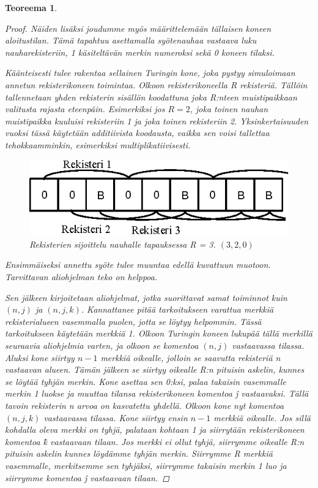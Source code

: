 \documentclass[a4paper, 12pt]{article}
\newtheorem{teor}{Teoreema}
\begin{document}
\begin{teor}
\begin{proof}
Näiden lisäksi joudumme myös määrittelemään tällaisen koneen aloitustilan. Tämä tapahtuu asettamalla syötenauhaa vastaava luku nauharekisteriin, 1 käsiteltävän merkin numeroksi sekä 0 koneen tilaksi.

Käänteisesti tulee rakentaa sellainen Turingin kone, joka pystyy simuloimaan annetun rekisterikoneen toimintaa. Olkoon rekisterikoneella R rekisteriä. Tällöin tallennetaan yhden rekisterin sisällön koodattuna joka R:nteen muistipaikkaan valitusta rajasta eteenpäin. Esimerkiksi jos $R = 2$, joka toinen nauhan muistipaikka kuuluisi rekisteriin 1 ja joka toinen rekisteriin 2. Yksinkertaisuuden vuoksi tässä käytetään additiivista koodausta, vaikka sen voisi tallettaa tehokkaamminkin, esimerkiksi multiplikatiivisesti. 

\begin{figure}[H]
\begin{center}
\includegraphics{graph4b.eps}
\caption{Rekisterien sijoittelu nauhalle tapauksessa R = 3. $(3, 2, 0)$}
\end{center}
\end{figure}

Ensimmäiseksi annettu syöte tulee muuntaa edellä kuvattuun muotoon. Tarvittavan aliohjelman teko on helppoa.

Sen jälkeen kirjoitetaan aliohjelmat, jotka suorittavat samat toiminnot kuin $(n, j)$ ja $(n, j, k)$. Kannattanee pitää tarkoitukseen varattua merkkiä rekisterialueen vasemmalla puolen, jotta se löytyy helpommin. Tässä tarkoitukseen käytetään merkkiä 1. Olkoon Turingin koneen lukupää tällä merkillä seuraavia aliohjelmia varten, ja olkoon se komentoa $(n, j)$ vastaavassa tilassa. Aluksi kone siirtyy $n-1$ merkkiä oikealle, jolloin se saavutta rekisteriä n vastaavan alueen. Tämän jälkeen se siirtyy oikealle R:n pituisin askelin, kunnes se löytää tyhjän merkin. Kone asettaa sen 0:ksi, palaa takaisin vasemmalle merkin 1 luokse ja muuttaa tilansa rekisterikoneen komentoa \^j vastaavaksi. Tällä tavoin rekisterin n arvoa on kasvatettu yhdellä. Olkoon kone nyt komentoa $(n, j, k)$ vastaavassa tilassa. Kone siirtyy ensin $n - 1$ merkkiä oikealle. Jos sillä kohdalla oleva merkki on tyhjä, palataan kohtaan 1 ja siirrytään rekisterikoneen komentoa \^k vastaavaan tilaan. Jos merkki ei ollut tyhjä, siirrymme oikealle R:n pituisin askelin kunnes löydämme tyhjän merkin. Siirrymme R merkkiä vasemmalle, merkitsemme sen tyhjäksi, siirrymme takaisin merkin 1 luo ja siirrymme komentoa \^j vastaavaan tilaan.


\end{proof}
\end{teor}
\end{document}
